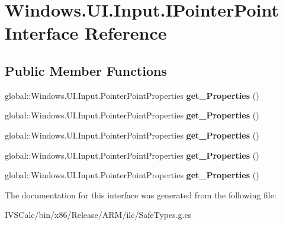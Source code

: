 \hypertarget{interface_windows_1_1_u_i_1_1_input_1_1_i_pointer_point}{}\section{Windows.\+U\+I.\+Input.\+I\+Pointer\+Point Interface Reference}
\label{interface_windows_1_1_u_i_1_1_input_1_1_i_pointer_point}
\subsection*{Public Member Functions}
\begin{DoxyCompactItemize}
\item 
\mbox{\label{interface_windows_1_1_u_i_1_1_input_1_1_i_pointer_point_a3f2b796be3ec0d899da8997290c367e6}} 
global\+::\+Windows.\+U\+I.\+Input.\+Pointer\+Point\+Properties {\bfseries get\+\_\+\+Properties} ()
\item 
\mbox{\label{interface_windows_1_1_u_i_1_1_input_1_1_i_pointer_point_a3f2b796be3ec0d899da8997290c367e6}} 
global\+::\+Windows.\+U\+I.\+Input.\+Pointer\+Point\+Properties {\bfseries get\+\_\+\+Properties} ()
\item 
\mbox{\label{interface_windows_1_1_u_i_1_1_input_1_1_i_pointer_point_a3f2b796be3ec0d899da8997290c367e6}} 
global\+::\+Windows.\+U\+I.\+Input.\+Pointer\+Point\+Properties {\bfseries get\+\_\+\+Properties} ()
\item 
\mbox{\label{interface_windows_1_1_u_i_1_1_input_1_1_i_pointer_point_a3f2b796be3ec0d899da8997290c367e6}} 
global\+::\+Windows.\+U\+I.\+Input.\+Pointer\+Point\+Properties {\bfseries get\+\_\+\+Properties} ()
\item 
\mbox{\label{interface_windows_1_1_u_i_1_1_input_1_1_i_pointer_point_a3f2b796be3ec0d899da8997290c367e6}} 
global\+::\+Windows.\+U\+I.\+Input.\+Pointer\+Point\+Properties {\bfseries get\+\_\+\+Properties} ()
\end{DoxyCompactItemize}


The documentation for this interface was generated from the following file\+:\begin{DoxyCompactItemize}
\item 
I\+V\+S\+Calc/bin/x86/\+Release/\+A\+R\+M/ilc/Safe\+Types.\+g.\+cs\end{DoxyCompactItemize}
